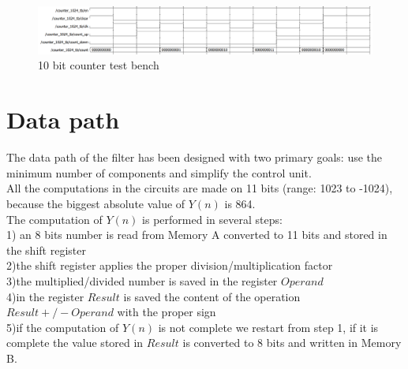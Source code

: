 \documentclass[12pt]{article}
\begin{document}
\begin{figure}[h]
	\centering
	\includegraphics[scale = 0.47]{immagini/counter_tb.png}
	\caption{10 bit counter test bench}
\end{figure}

\section*{Data path}
The data path of the filter has been designed with two primary goals: use the minimum number of components and simplify the control unit.\\
All the computations in the circuits are made on 11 bits (range: 1023 to -1024), because the biggest absolute value of $Y(n)$ is 864. \\
The computation of $Y(n)$ is performed in several steps:\\
1) an 8 bits number is read from Memory A converted to 11 bits and stored in the shift register\\
2)the shift register applies the proper division/multiplication factor\\
3)the multiplied/divided number is saved in the register $Operand$\\
4)in the register $Result$ is saved the content of the operation $Result +/- Operand$ with the proper sign\\
5)if the computation of $Y(n)$ is not complete we restart from step 1, if it is complete the value stored in $Result$ is converted to 8 bits and written in Memory B.\\
\end{document}

